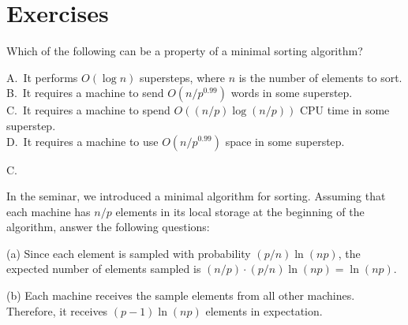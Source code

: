 


\usepackage{amsfonts, amsmath, amssymb, amsthm}
\usepackage{comment} 
\usepackage{graphicx}
\usepackage{ifthen}
\usepackage{latexsym}







\section*{Exercises}

 Which of the following can be a property of a minimal sorting algorithm? 


\vgap

\noindent A.\ It performs $O(\log n)$ supersteps, where $n$ is the number of elements to sort. \\
\noindent B.\ It requires a machine to send $O(n/p^{0.99})$ words in some superstep. \\
\noindent C.\ It requires a machine to spend $O((n/p) \log (n/p))$ CPU time in some superstep. \\
\noindent D.\ It requires a machine to use $O(n/p^{0.99})$ space in some superstep. 

\begin{sol}
    C.
\end{sol}


 In the seminar, we introduced a minimal algorithm for sorting. Assuming that each machine has $n/p$ elements in its local storage at the beginning of the algorithm, answer the following questions: 

\begin{sol}
    (a) Since each element is sampled with probability $(p/n) \ln(np)$, the expected number of elements sampled is $(n/p) \cdot (p/n) \ln(np) = \ln(np)$. 
   
   \vgap 
   
   (b) Each machine receives the sample elements from all other machines. Therefore, it receives $(p-1) \ln(np)$ elements in expectation. 
\end{sol}

